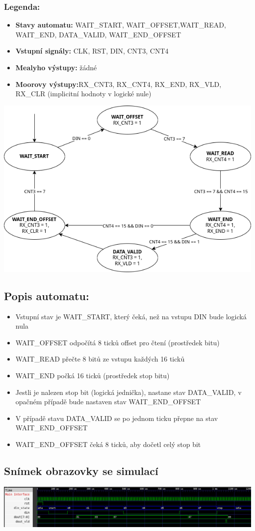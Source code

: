 \documentclass{article}
\begin{document}
	\subsubsection{Legenda:}
	\begin{itemize}
		\item \textbf{Stavy automatu:} WAIT\_START, WAIT\_OFFSET,WAIT\_READ,
				WAIT\_END, DATA\_VALID, WAIT\_END\_OFFSET
		\item \textbf{Vstupní signály:} CLK, RST, DIN, CNT3, CNT4
		\item \textbf{Mealyho výstupy:} žádné
		\item \textbf{Moorovy výstupy:}RX\_CNT3, RX\_CNT4, RX\_END,
				RX\_VLD, RX\_CLR (implicitní hodnoty v logické nule)
	\end{itemize}

	\includegraphics[scale=0.69]{./src/automat.png}

	\subsection{Popis automatu:}
	\begin{itemize}
		\item Vstupní stav je WAIT\_START, který čeká, než na vstupu DIN 
				bude logická nula
		\item WAIT\_OFFSET odpočítá 8 ticků offset pro čtení (prostředek bitu)
		\item WAIT\_READ přečte 8 bitů ze vstupu každých 16 ticků
		\item WAIT\_END počká 16 ticků (prostředek stop bitu)
		\item Jestli je nalezen stop bit (logická jednička), nastane 
				stav DATA\_VALID, v opačném případě bude nastaven stav
				WAIT\_END\_OFFSET
		\item V případě stavu DATA\_VALID se po jednom ticku přepne 
				na stav WAIT\_END\_OFFSET
		\item WAIT\_END\_OFFSET čeká 8 ticků, aby dočetl celý stop bit
	\end{itemize}


	\begin{landscape}
		\section{Snímek obrazovky se simulací}
		\includegraphics[scale=0.5953]{./src/simulation.png}
	\end{landscape}
\end{document}
